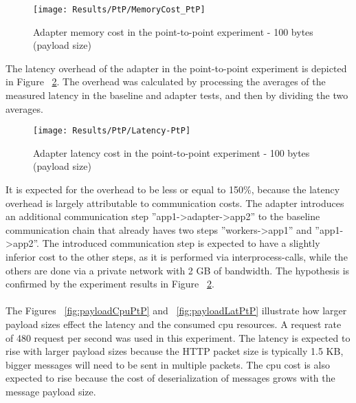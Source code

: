 \begin{figure}[htbp]
    \centering
    \texttt{[image: Results/PtP/MemoryCost\_PtP]}
    \caption{Adapter memory cost in the point-to-point experiment - 100 bytes (payload size)}
    \label{fig:memCostPtp}
\end{figure}

\newpage

The latency overhead of the adapter in the point-to-point experiment is depicted in Figure ~\ref{fig:latPtP}.
The overhead was calculated by processing the averages of the measured latency in the baseline and adapter tests, and then by dividing the two averages.

\begin{figure}[htbp]
    \centering
    \texttt{[image: Results/PtP/Latency-PtP]}
    \caption{Adapter latency cost in the point-to-point experiment - 100 bytes (payload size)}
    \label{fig:latPtP}
\end{figure}

It is expected for the overhead to be less or equal to 150\%, because the latency overhead is largely attributable to communication costs.
The adapter introduces an additional communication step ''app1->adapter->app2'' to the baseline communication chain that already haves two steps ''workers->app1'' and ''app1->app2''.
The introduced communication step is expected to have a slightly inferior cost to the other steps, as it is performed via interprocess-calls, while the others are done via a private network with 2 GB of bandwidth.
The hypothesis is confirmed by the experiment results in Figure ~\ref{fig:latPtP}.

\paragraph{}

The Figures  ~\ref{fig:payloadCpuPtP} and ~\ref{fig:payloadLatPtP} illustrate how larger payload sizes effect the latency and the consumed cpu resources.
A request rate of 480 request per second was used in this experiment.
The latency is expected to rise with larger payload sizes because the HTTP packet size is typically 1.5 KB, bigger messages will need to be sent in multiple packets.
The cpu cost is also expected to rise because the cost of deserialization of messages grows with the message payload size.

\paragraph{}

